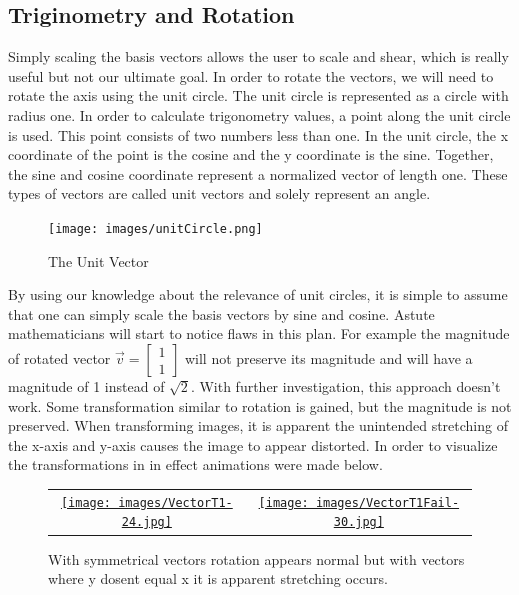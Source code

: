 \subsection{Triginometry and Rotation}
\hspace{\parindent}%
Simply scaling the basis vectors allows the user to scale and shear, which is really useful but not our ultimate goal. In order to rotate the vectors, we will need to rotate the axis using the unit circle. The unit circle is represented as a circle with radius one. In order to calculate trigonometry values, a point along the unit circle is used. This point consists of two numbers less than one. In the unit circle, the x coordinate of the point is the cosine and the y coordinate is the sine. Together, the sine and cosine coordinate represent a normalized vector of length one. These types of vectors are called unit vectors and solely represent an angle.

\begin{figure}[ht]\centering %
	\texttt{[image: images/unitCircle.png]}
	\caption{The Unit Vector}
	\label{fig:unitVec}
\end{figure}

By using our knowledge about the relevance of unit circles, it is simple to assume that one can simply scale the basis vectors by sine and cosine. Astute mathematicians will start to notice flaws in this plan. For example the magnitude of rotated vector $\vec{v}=\begin{bmatrix}1\\1\end{bmatrix}$ will not preserve its magnitude and will have a magnitude of 1 instead of $\sqrt{2}$. With further investigation, this approach doesn't work. Some transformation similar to rotation is gained, but the magnitude is not preserved. When transforming images, it is apparent the unintended stretching of the x-axis and y-axis causes the image to appear distorted. In order to visualize the transformations in in effect animations were made below.


\begin{figure}[ht]\centering %
\begin{tabular}{ c c }
	\href{https://raw.githubusercontent.com/beastr45/MathIA-bear/main/latex/Figures/images/gifs/VectorT1.gif}{\texttt{[image: images/VectorT1-24.jpg]}} & \href{https://raw.githubusercontent.com/beastr45/MathIA-bear/main/latex/Figures/images/gifs/VectorT1Fail.gif}{\texttt{[image: images/VectorT1Fail-30.jpg]}}
\end{tabular}
	\caption{With symmetrical vectors rotation appears normal but with vectors where y dosent equal x it is apparent stretching occurs.}
	\label{fig:exGifs}
\end{figure}

